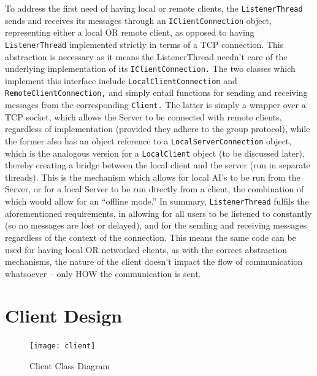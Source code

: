 \documentclass[a4paper,doc]{apa6}
\newcommand{\code}{\texttt}
\begin{document}
To address the first need of having local or remote clients, the \code{ListenerThread} sends and receives its messages through an \code{IClientConnection} object, representing either a local OR remote client, as opposed to having \code{ListenerThread} implemented strictly in terms of a TCP connection. This abstraction is necessary as it means the ListenerThread needn’t care of the underlying implementation of its \code{IClientConnection.} The two classes which implement this interface include \code{LocalClientConnection} and \code{RemoteClientConnection,} and simply entail functions for sending and receiving messages from the corresponding \code{Client.} The latter is simply a wrapper over a TCP socket, which allows the Server to be connected with remote clients, regardless of implementation (provided they adhere to the group protocol), while the former also has an object reference to a \code{LocalServerConnection} object, which is the analogous version for a \code{LocalClient} object (to be discussed later), thereby creating a bridge between the local client and the server (run in separate threads). This is the mechanism which allows for local AI’s to be run from the Server, or for a local Server to be run directly from a client, the combination of which would allow for an “offline mode.” In summary, \code{ListenerThread} fulfils the aforementioned requirements, in allowing for all users to be listened to constantly (so no messages are lost or delayed), and for the sending and receiving messages regardless of the context of the connection. This means the same code can be used for having local OR networked clients, as with the correct abstraction mechanisms, the nature of the client doesn’t impact the flow of communication whatsoever -- only HOW the communication is sent.

\section{Client Design}
\begin{figure}[hbtp]
      \texttt{[image: client]}
      \caption{Client Class Diagram}
\end{figure}
\end{document}
